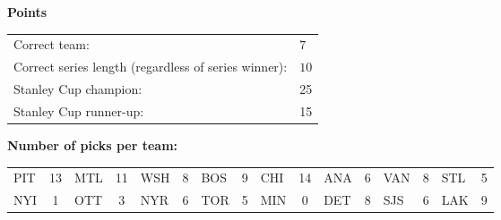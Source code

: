 \documentclass[10pt]{article}
\begin{document}
{\bf Points}\\
\begin{minipage}{12cm}
    \begin{tabular}{l l}
        Correct team:	& $7$\\
        Correct series length (regardless of series winner):	& $10$\\
        Stanley Cup champion:	& 25\\
        Stanley Cup runner-up:	& 15\\
    \end{tabular}

    \vspace{1cm}
    {\bf Number of picks per team:}\\
    \begin{tabular}{lc | lc | lc | lc | lc | lc | lc | lc }
        PIT & 13 & MTL & 11 & WSH & 8 & BOS & 9 & CHI & 14 & ANA & 6 & VAN & 8 & STL & 5 \\
        NYI & 1 & OTT & 3 & NYR & 6 & TOR & 5 & MIN & 0 & DET & 8 & SJS & 6 & LAK & 9 \\
    \end{tabular}
\end{minipage}
\end{document}
